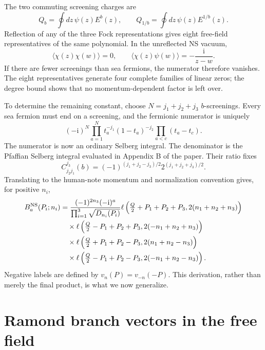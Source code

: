 \documentclass[11pt]{article}
\newcommand{\NS}{\mathrm{NS}}
\newcommand{\ii}{\mathrm i}
\begin{document}
The two commuting screening charges are
\begin{equation}
 Q_b=\oint dz\,\psi(z)E^b(z),\qquad
 Q_{1/b}=\oint dz\,\psi(z)E^{1/b}(z).
 \label{eq:screenings}
\end{equation}
Reflection of any of the three Fock representations gives eight free-field
representatives of the same polynomial.  In the unreflected NS vacuum,
\begin{equation}
 \langle\chi(z)\chi(w)\rangle=0,
 \qquad \langle\chi(z)\psi(w)\rangle=-\frac{\ii}{z-w}.
 \label{eq:NS-zero}
\end{equation}
If there are fewer screenings than sea fermions, the numerator therefore
vanishes.  The eight representatives generate four complete families of
linear zeros; the degree bound shows that no momentum-dependent factor is
left over.

To determine the remaining constant, choose $N=j_1+j_2+j_3$ $b$-screenings.
Every sea fermion must end on a screening, and the fermionic numerator is
uniquely
\begin{equation}
 (-\ii)^N\prod_{a=1}^Nt_a^{-j_1}(1-t_a)^{-j_2}
 \prod_{a<c}(t_a-t_c).
 \label{eq:NS-vandermonde}
\end{equation}
The numerator is now an ordinary Selberg integral.  The denominator is the
Pfaffian Selberg integral evaluated in Appendix B of the paper.  Their ratio
fixes
\begin{equation}
 C^{j_3}_{j_2j_1}(b)=
 (-1)^{(j_1+j_2-j_3)/2}2^{(j_1+j_2+j_3)/2}.
 \label{eq:HJconstant}
\end{equation}
Translating to the human-note momentum and normalization convention gives,
for positive $n_i$,
\begin{align}
 B_a^{\NS}(P_i;n_i)
 &=\frac{(-1)^{2n_3}(-\ii)^a}{\prod_{i=1}^3\sqrt{D_{n_i}(P_i)}}
 \ell\left(\tfrac Q2+P_1+P_2+P_3,2(n_1+n_2+n_3)\right)\notag\\
 &\quad\times
 \ell\left(\tfrac Q2-P_1+P_2+P_3,2(-n_1+n_2+n_3)\right)\notag\\
 &\quad\times
 \ell\left(\tfrac Q2+P_1+P_2-P_3,2(n_1+n_2-n_3)\right)\notag\\
 &\quad\times
 \ell\left(\tfrac Q2-P_1+P_2-P_3,2(-n_1+n_2-n_3)\right).
 \label{eq:NS-result}
\end{align}
Negative labels are defined by $v_n(P)=v_{-n}(-P)$.  This derivation, rather
than merely the final product, is what we now generalize.

\section{Ramond branch vectors in the free field}
\end{document}
